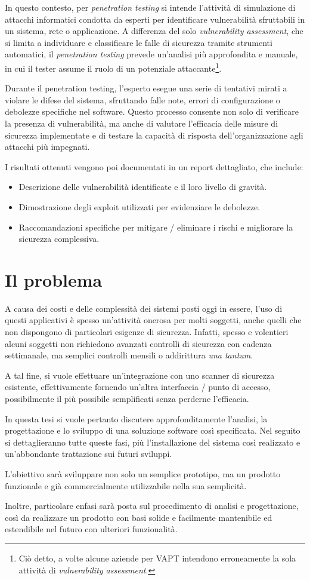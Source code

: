 In questo contesto, per \emph{penetration testing} si intende l'attività di simulazione di attacchi informatici condotta da esperti per identificare vulnerabilità sfruttabili in un sistema, rete o applicazione. A differenza del solo \emph{vulnerability assessment}, che si limita a individuare e classificare le falle di sicurezza tramite strumenti automatici, il \emph{penetration testing} prevede un'analisi più approfondita e manuale, in cui il tester assume il ruolo di un potenziale attaccante\footnote{Ciò detto, a volte alcune aziende per VAPT intendono erroneamente la sola attività di \emph{vulnerability assessment}.}.

Durante il penetration testing, l'esperto esegue una serie di tentativi mirati a violare le difese del sistema, sfruttando falle note, errori di configurazione o debolezze specifiche nel software. Questo processo consente non solo di verificare la presenza di vulnerabilità, ma anche di valutare l'efficacia delle misure di sicurezza implementate e di testare la capacità di risposta dell'organizzazione agli attacchi più impegnati.

I risultati ottenuti vengono poi documentati in un report dettagliato, che include:
\begin{itemize}
    \item Descrizione delle vulnerabilità identificate e il loro livello di gravità.
    \item Dimostrazione degli exploit utilizzati per evidenziare le debolezze.
    \item Raccomandazioni specifiche per mitigare / eliminare i rischi e migliorare la sicurezza complessiva.
\end{itemize}

\section{Il problema}
A causa dei costi e delle complessità dei sistemi posti oggi in essere, l'uso di questi applicativi è spesso un'attività onerosa per molti soggetti, anche quelli che non dispongono di particolari esigenze di sicurezza. Infatti, spesso e volentieri alcuni soggetti non richiedono avanzati controlli di sicurezza con cadenza settimanale, ma semplici controlli mensili o addirittura \emph{una tantum}.

A tal fine, si vuole effettuare un'integrazione con uno scanner di sicurezza esistente, effettivamente fornendo un'altra interfaccia / punto di accesso, possibilmente il più possibile semplificati senza perderne l'efficacia.

In questa tesi si vuole pertanto discutere approfonditamente l'analisi, la progettazione e lo sviluppo di una soluzione software così specificata.
Nel seguito si dettaglieranno tutte queste fasi, più l'installazione del sistema così realizzato e un'abbondante trattazione sui futuri sviluppi.

L'obiettivo sarà sviluppare non solo un semplice prototipo, ma un prodotto funzionale e già commercialmente utilizzabile nella sua semplicità.

Inoltre, particolare enfasi sarà posta sul procedimento di analisi e progettazione, così da realizzare un prodotto con basi solide e facilmente mantenibile ed estendibile nel futuro con ulteriori funzionalità.